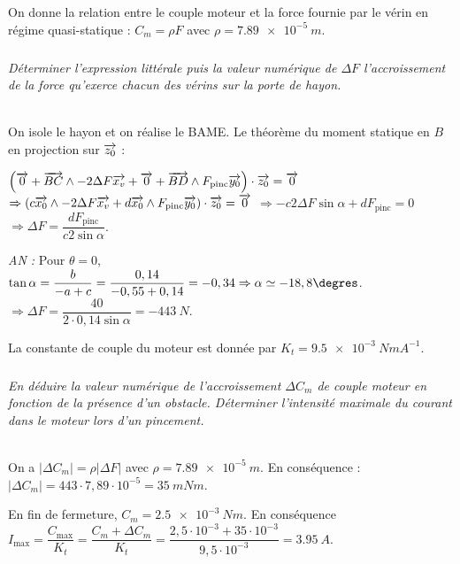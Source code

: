\documentclass[10pt,fleqn]{article} %
\begin{document}
\begin{multicols}{2}
\begin{multicols}{2}
On donne la relation entre le couple moteur et la force fournie par le vérin en régime quasi-statique : $C_m=\rho F$ avec $\rho=\SI{7,89e-5}{m}$.

\fi


\subparagraph{}
\textit{Déterminer l’expression littérale puis la valeur
numérique de $\Delta F$ l’accroissement de la force qu’exerce chacun des vérins sur la porte de hayon.}
\ifprof
\begin{corrige}~\\
On isole le hayon et on réalise le BAME. Le théorème du moment statique en $B$ en projection sur $\overrightarrow{z_0}$ : 

$ \left( 
\overrightarrow{0} + \overrightarrow{BC}\wedge -2\Delta F \overrightarrow{x_v}
+ \overrightarrow{0} + \overrightarrow{BD}\wedge F_{\text{pinc}}\overrightarrow{y_0}
\right) \cdot \overrightarrow{z_0} = \overrightarrow{0} $
$\Rightarrow \left( 
c\overrightarrow{x_0}\wedge -2\Delta F \overrightarrow{x_v}
+ d\overrightarrow{x_0}\wedge F_{\text{pinc}}\overrightarrow{y_0}
\right) \cdot \overrightarrow{z_0} = \overrightarrow{0}$
$\Rightarrow  
-c 2\Delta F  \sin \alpha + dF_{\text{pinc}}  = {0} $
$\Rightarrow  
\Delta F  = \dfrac{dF_{\text{pinc}}}{c 2  \sin \alpha}  $. 

\textit{AN :}
Pour $\theta=0$, $ \tan \alpha = \dfrac{b}{-a+c}=\dfrac{0,14}{-0,55+0,14}=-0,34 \Rightarrow \alpha \simeq -18,8 \degres$.
$\Rightarrow  
\Delta F  = \dfrac{40}{2\cdot 0,14  \sin \alpha} = \SI{-443}{N} $.
\end{corrige}
\else

\fi

La constante de couple du moteur est donnée par $K_t = \SI{9,5e-3}{NmA^{-1}}$.

\subparagraph{}
\textit{En déduire la valeur numérique de l’accroissement $\Delta C_m$  de couple moteur en fonction de la présence d’un obstacle. Déterminer l’intensité maximale du courant dans le moteur lors d’un pincement.}%
\ifprof
\begin{corrige}~\\
On a $\left|\Delta C_m\right|=\rho \left|\Delta F \right|$ avec $\rho=\SI{7,89e-5}{m}$. En conséquence : $\left|\Delta C_m\right|=443 \cdot 7,89 \cdot 10^{-5} = \SI{35}{mNm}$.

En fin de fermeture, $C_m=\SI{2,5e-3}{Nm}$.
En conséquence $I_{\text{max}}=\dfrac{C_{\text{max}}}{K_t}=\dfrac{C_{m}+\Delta C_m}{K_t}=\dfrac{2,5\cdot 10^{-3}+35\cdot 10^{-3}}{9,5\cdot 10^{-3}}=\SI{3,95}{A}$.

\end{corrige}
\else
\fi


\end{multicols}
\end{multicols}
\end{document}
